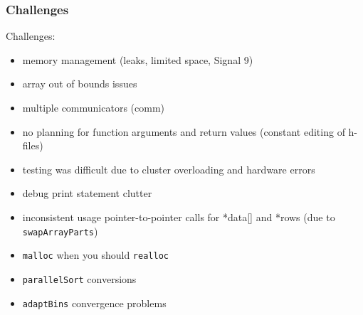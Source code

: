 \documentclass[usernames,dvipsnames]{beamer}
\begin{document}
\begin{frame}	
	\frametitle{Challenges}
	
	\begin{alertblock}{Challenges:}
		\begin{itemize}
		\item memory management (leaks, limited space, Signal 9)
		\item array out of bounds issues
		\item multiple communicators (comm)
		\item no planning for function arguments and return values (constant editing of h-files)
		\item testing was difficult due to cluster overloading and hardware errors
		\item debug print statement clutter
		\item inconsistent usage pointer-to-pointer calls for *data[] and *rows (due to \texttt{swapArrayParts})
		\item \texttt{malloc} when you should \texttt{realloc}
		\item \texttt{parallelSort} conversions
		\item \texttt{adaptBins} convergence problems
		\end{itemize}
	\end{alertblock}

\end{frame}
\end{document}

